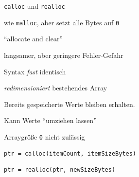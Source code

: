 
\begin{frame}[fragile]{\texttt{calloc} und \texttt{realloc}}
%
%
\begin{itembox}
\item wie \texttt{malloc}, aber setzt alle Bytes auf \texttt{0}
\item \enquote{allocate and clear}
\item langsamer, aber geringere Fehler-Gefahr
\item Syntax \emph{fast} identisch
\end{itembox}
%
\begin{itembox}
\item \emph{redimensioniert} bestehendes Array
\item Bereits gespeicherte Werte bleiben erhalten.
\item Kann Werte \enquote{umziehen lassen}
\item Arraygröße \texttt{0} nicht zulässig
\end{itembox}
%
%
\begin{codebox}[Syntax]
\begin{verbatim}
ptr = calloc(itemCount, itemSizeBytes)
\end{verbatim}
\end{codebox}
%
\begin{codebox}[Syntax]
\begin{verbatim}
ptr = realloc(ptr, newSizeBytes)
\end{verbatim}
\end{codebox}
%
\end{frame}


